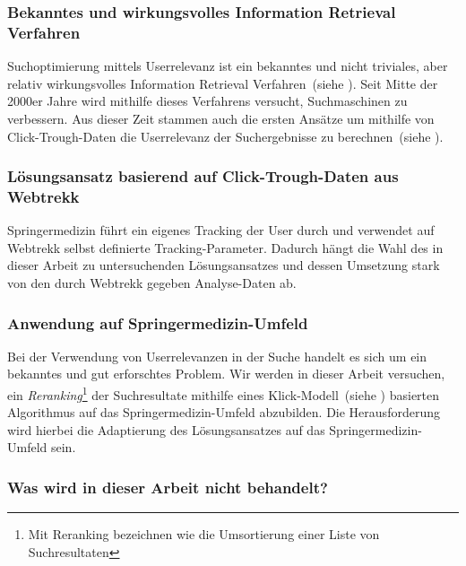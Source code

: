 \subsubsection{Bekanntes und wirkungsvolles Information Retrieval Verfahren}
\label{sec:Einfuehrung:ZielArbeit:AbbildungSpringermedizinUmfeld:InformationRetrievalVerfahren}

Suchoptimierung mittels Userrelevanz ist ein bekanntes und nicht triviales, aber relativ wirkungsvolles Information Retrieval Verfahren~(siehe \cite{IWUSBI}). Seit Mitte der 2000er Jahre wird mithilfe dieses Verfahrens versucht, Suchmaschinen zu verbessern. Aus dieser Zeit stammen auch die ersten Ansätze um mithilfe von Click-Trough-Daten die Userrelevanz der Suchergebnisse zu berechnen~(siehe \cite{Joachims}).

\subsubsection{Lösungsansatz basierend auf Click-Trough-Daten aus Webtrekk}
\label{sec:Einfuehrung:ZielArbeit:AbbildungSpringermedizinUmfeld:Loesungsansatz}

Springermedizin führt ein eigenes Tracking der User durch und verwendet auf Webtrekk selbst definierte Tracking-Parameter. Dadurch hängt die Wahl des in dieser Arbeit zu untersuchenden Lösungsansatzes und dessen Umsetzung stark von den durch Webtrekk gegeben Analyse-Daten ab.

\subsubsection{Anwendung auf Springermedizin-Umfeld}
\label{sec:Einfuehrung:ZielArbeit:AbbildungSpringermedizinUmfeld:Adaptierung}

Bei der Verwendung von Userrelevanzen in der Suche handelt es sich um ein bekanntes und gut erforschtes Problem. Wir werden in dieser Arbeit versuchen, ein \textit{Reranking}\footnote{Mit Reranking bezeichnen wie die Umsortierung einer Liste von Suchresultaten} der Suchresultate mithilfe eines Klick-Modell~(siehe \cite{pbm}) basierten Algorithmus auf das Springermedizin-Umfeld abzubilden. Die Herausforderung wird hierbei die Adaptierung des Lösungsansatzes auf das Springermedizin-Umfeld sein.

\subsubsection{Was wird in dieser Arbeit nicht behandelt?}
\label{sec:Einfuehrung:ZielArbeit:AbbildungSpringermedizinUmfeld:NichtBehandeln}

